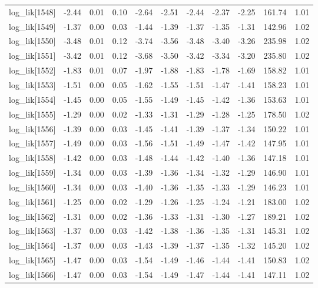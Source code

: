 \begin{table}[ht]
\begin{tabular}{rrrrrrrrrrr}
  log\_lik[1548] & -2.44 & 0.01 & 0.10 & -2.64 & -2.51 & -2.44 & -2.37 & -2.25 & 161.74 & 1.01 \\ 
  log\_lik[1549] & -1.37 & 0.00 & 0.03 & -1.44 & -1.39 & -1.37 & -1.35 & -1.31 & 142.96 & 1.02 \\ 
  log\_lik[1550] & -3.48 & 0.01 & 0.12 & -3.74 & -3.56 & -3.48 & -3.40 & -3.26 & 235.98 & 1.02 \\ 
  log\_lik[1551] & -3.42 & 0.01 & 0.12 & -3.68 & -3.50 & -3.42 & -3.34 & -3.20 & 235.80 & 1.02 \\ 
  log\_lik[1552] & -1.83 & 0.01 & 0.07 & -1.97 & -1.88 & -1.83 & -1.78 & -1.69 & 158.82 & 1.01 \\ 
  log\_lik[1553] & -1.51 & 0.00 & 0.05 & -1.62 & -1.55 & -1.51 & -1.47 & -1.41 & 158.23 & 1.01 \\ 
  log\_lik[1554] & -1.45 & 0.00 & 0.05 & -1.55 & -1.49 & -1.45 & -1.42 & -1.36 & 153.63 & 1.01 \\ 
  log\_lik[1555] & -1.29 & 0.00 & 0.02 & -1.33 & -1.31 & -1.29 & -1.28 & -1.25 & 178.50 & 1.02 \\ 
  log\_lik[1556] & -1.39 & 0.00 & 0.03 & -1.45 & -1.41 & -1.39 & -1.37 & -1.34 & 150.22 & 1.01 \\ 
  log\_lik[1557] & -1.49 & 0.00 & 0.03 & -1.56 & -1.51 & -1.49 & -1.47 & -1.42 & 147.95 & 1.01 \\ 
  log\_lik[1558] & -1.42 & 0.00 & 0.03 & -1.48 & -1.44 & -1.42 & -1.40 & -1.36 & 147.18 & 1.01 \\ 
  log\_lik[1559] & -1.34 & 0.00 & 0.03 & -1.39 & -1.36 & -1.34 & -1.32 & -1.29 & 146.90 & 1.01 \\ 
  log\_lik[1560] & -1.34 & 0.00 & 0.03 & -1.40 & -1.36 & -1.35 & -1.33 & -1.29 & 146.23 & 1.01 \\ 
  log\_lik[1561] & -1.25 & 0.00 & 0.02 & -1.29 & -1.26 & -1.25 & -1.24 & -1.21 & 183.00 & 1.02 \\ 
  log\_lik[1562] & -1.31 & 0.00 & 0.02 & -1.36 & -1.33 & -1.31 & -1.30 & -1.27 & 189.21 & 1.02 \\ 
  log\_lik[1563] & -1.37 & 0.00 & 0.03 & -1.42 & -1.38 & -1.36 & -1.35 & -1.31 & 145.31 & 1.02 \\ 
  log\_lik[1564] & -1.37 & 0.00 & 0.03 & -1.43 & -1.39 & -1.37 & -1.35 & -1.32 & 145.20 & 1.02 \\ 
  log\_lik[1565] & -1.47 & 0.00 & 0.03 & -1.54 & -1.49 & -1.46 & -1.44 & -1.41 & 150.83 & 1.02 \\ 
  log\_lik[1566] & -1.47 & 0.00 & 0.03 & -1.54 & -1.49 & -1.47 & -1.44 & -1.41 & 147.11 & 1.02 \\ 

\end{tabular}
\end{table}

